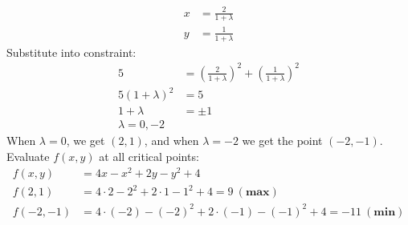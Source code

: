{\begin{align*}
        x&=\frac{2}{1+\lambda} \\
        y&=\frac{1}{1+\lambda}
    \end{align*}
    Substitute into constraint: 
    \begin{align*}
        5 &=\left(\frac{2}{1+\lambda}\right)^2 + \left(\frac{1}{1+\lambda}\right)^2 \\
        5(1+\lambda)^2 &= 5 \\
        1 + \lambda &= \pm 1 \\
        \lambda = 0, -2
    \end{align*}
    When $\lambda = 0$, we get $(2,1)$, and when $\lambda = -2$ we get the point $(-2,-1)$. 
    Evaluate $f(x,y)$ at all critical points:
    \begin{align*}
        f(x,y) &= 4x - x^2 + 2y - y^2  + 4\\
        f(2,1) &= 4\cdot 2 - 2^2 + 2\cdot1 - 1^2+4 = 9 \ (\textbf{max})\\
        f(-2,-1) &= 4\cdot (-2) - (-2)^2 + 2\cdot(-1) - (-1)^2+4 = -11 \ (\textbf{min})
    \end{align*}
    } 
   \else
   \fi

\fi 


